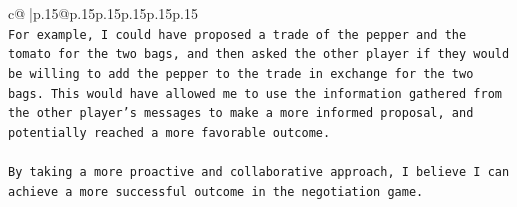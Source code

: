 \documentclass{article}
\begin{document}
{\begin{supertabular}{c@{$\;$}|p{.15\linewidth}@{}p{.15\linewidth}p{.15\linewidth}p{.15\linewidth}p{.15\linewidth}p{.15\linewidth}}
{{{\\ 
\texttt{For example, I could have proposed a trade of the pepper and the tomato for the two bags, and then asked the other player if they would be willing to add the pepper to the trade in exchange for the two bags. This would have allowed me to use the information gathered from the other player's messages to make a more informed proposal, and potentially reached a more favorable outcome.} \\
\\ 
\texttt{By taking a more proactive and collaborative approach, I believe I can achieve a more successful outcome in the negotiation game.} \\
            }
        }
    }
     \\ \\

\end{supertabular}
}
\end{document}
